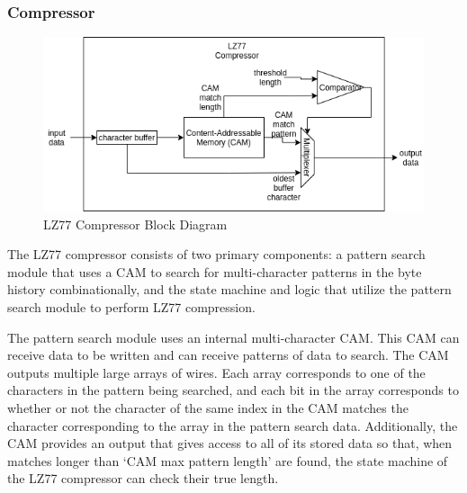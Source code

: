 \documentclass[doublespace,nopageskip]{VTthesis}
\begin{document}
\subsubsection{Compressor}\label{sss:lz77_compressor_implementation}

\begin{figure}[htb]
	\centering
	\includegraphics[scale=0.8]{LZ77 Compressor.png}
	\caption{LZ77 Compressor Block Diagram}
	\label{fig:lz77_compressor_block_diagram}
\end{figure}

The LZ77 compressor consists of two primary components: a pattern search module that uses a CAM to search for multi-character patterns in the byte history combinationally, and the state machine and logic that utilize the pattern search module to perform LZ77 compression.

The pattern search module uses an internal multi-character CAM. This CAM can receive data to be written and can receive patterns of data to search. The CAM outputs multiple large arrays of wires. Each array corresponds to one of the characters in the pattern being searched, and each bit in the array corresponds to whether or not the character of the same index in the CAM matches the character corresponding to the array in the pattern search data. Additionally, the CAM provides an output that gives access to all of its stored data so that, when matches longer than `CAM max pattern length' are found, the state machine of the LZ77 compressor can check their true length.
\end{document}
